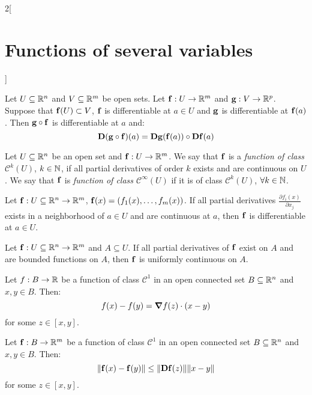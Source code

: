 \documentclass[../../../main.tex]{subfiles}
\begin{document}
\begin{multicols}{2}[\section{Functions of several variables}]
\begin{theorem}
    \end{theorem}
    \begin{theorem}
        Let $U\subseteq\mathbb{R}^n$ and $V\subseteq\mathbb{R}^m$ be open sets. Let $\boldsymbol{\mathrm{f}}:U\rightarrow\mathbb{R}^m$ and $\boldsymbol{\mathrm{g}}:V\rightarrow\mathbb{R}^p$. Suppose that $\boldsymbol{\mathrm{f}}(U)\subset V$, $\boldsymbol{\mathrm{f}}$ is differentiable at $a\in U$ and $\boldsymbol{\mathrm{g}}$ is differentiable at $\boldsymbol{\mathrm{f}}(a)$. Then $\boldsymbol{\mathrm{g}}\circ \boldsymbol{\mathrm{f}}$ is differentiable at $a$ and: $$\boldsymbol{\mathrm{D}}(\boldsymbol{\mathrm{g}}\circ \boldsymbol{\mathrm{f}})(a)=\boldsymbol{\mathrm{Dg}}(\boldsymbol{\mathrm{f}}(a))\circ \boldsymbol{\mathrm{Df}}(a)$$
    \end{theorem}
    \begin{definition}
        Let $U\subseteq\mathbb{R}^n$ be an open set and $\boldsymbol{\mathrm{f}}:U\rightarrow\mathbb{R}^m$. We say that $\boldsymbol{\mathrm{f}}$ is a \textit{function of class $\mathcal{C}^k(U)$}, $k\in\mathbb{N} $, if all partial derivatives of order $k$ exists and are continuous on $U$. We say that $\boldsymbol{\mathrm{f}}$ is \textit{function of class $\mathcal{C}^\infty(U)$} if it is of class $\mathcal{C}^k(U)$, $\forall k\in\mathbb{N} $.
    \end{definition}
    \begin{theorem}
        Let $\boldsymbol{\mathrm{f}}:U\subseteq\mathbb{R}^n\rightarrow\mathbb{R}^m$, $\boldsymbol{\mathrm{f}}(x)=(f_1(x),\ldots,f_m(x))$. If all partial derivatives $\displaystyle \frac{\partial f_i(x)}{\partial x_j}$ exists in a neighborhood of $a\in U$ and are continuous at $a$, then $\boldsymbol{\mathrm{f}}$ is differentiable at $a\in U$.
    \end{theorem}
    \begin{prop}
        Let $\boldsymbol{\mathrm{f}}:U\subseteq\mathbb{R}^n\rightarrow\mathbb{R}^m$ and $A\subseteq U$. If all partial derivatives of $\boldsymbol{\mathrm{f}}$ exist on $A$ and are bounded functions on $A$, then $\boldsymbol{\mathrm{f}}$ is uniformly continuous on $A$.
    \end{prop}
    \begin{theorem}
        Let $f:B\rightarrow\mathbb{R} $ be a function of class $\mathcal{C}^1$ in an open connected set $B\subseteq\mathbb{R}^n$ and $x,y\in B$. Then: $$f(x)-f(y)=\grad f(z)\cdot(x-y)$$ for some $z\in[x,y]$.
    \end{theorem}
    \begin{theorem}
        Let $\boldsymbol{\mathrm{f}}:B\rightarrow\mathbb{R}^m$ be a function of class $\mathcal{C}^1$ in an open connected set $B\subseteq\mathbb{R}^n$ and $x,y\in B$. Then: $$\|\boldsymbol{\mathrm{f}}(x)-\boldsymbol{\mathrm{f}}(y)\|\leq\|\boldsymbol{\mathrm{Df}}(z)\|\|x-y\|$$ for some $z\in[x,y]$.
    \end{theorem}

\end{multicols}
\end{document}
